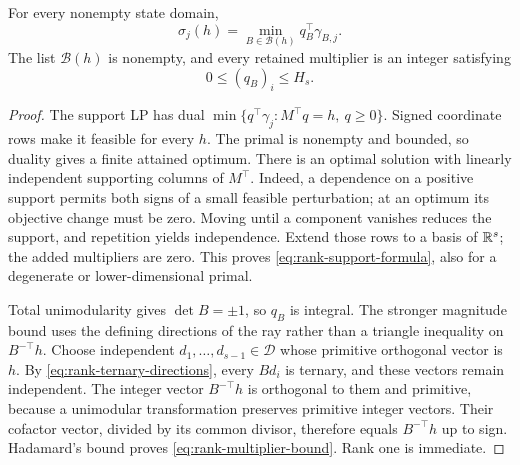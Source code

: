 \begin{lemma}\label{lem:rank-duals}
For every nonempty state domain,
\begin{equation}\label{eq:rank-support-formula}
 \sigma_j(h)=\min_{B\in\mathcal B(h)}q_B^\top\gamma_{B,j}.
\end{equation}
The list $\mathcal B(h)$ is nonempty, and every retained multiplier is
an integer satisfying
\begin{equation}\label{eq:rank-multiplier-bound}
                     0\le(q_B)_i\le H_s.
\end{equation}
\end{lemma}
\begin{proof}
The support LP has dual
$\min\{q^\top\gamma_j:M^\top q=h,\ q\ge0\}$. Signed coordinate
rows make it feasible for every $h$. The primal is nonempty and bounded,
so duality gives a finite attained optimum. There is an optimal solution
with linearly independent supporting columns of $M^\top$. Indeed, a
dependence on a positive support permits both signs of a small feasible
perturbation; at an optimum its objective change must be zero. Moving
until a component vanishes reduces the support, and repetition yields
independence. Extend those rows to a basis of $\mathbb R^s$; the added
multipliers are zero. This proves \eqref{eq:rank-support-formula}, also
for a degenerate or lower-dimensional primal.

Total unimodularity gives $\det B=\pm1$, so $q_B$ is integral. The
stronger magnitude bound uses the defining directions of the ray rather
than a triangle inequality on $B^{-\top}h$. Choose independent
$d_1,\ldots,d_{s-1}\in\mathcal D$ whose primitive orthogonal vector
is $h$. By \eqref{eq:rank-ternary-directions}, every $Bd_i$ is ternary,
and these vectors remain independent. The integer vector $B^{-\top}h$
is orthogonal to them and primitive, because a unimodular transformation
preserves primitive integer vectors. Their cofactor vector, divided by
its common divisor, therefore equals $B^{-\top}h$ up to sign. Hadamard's
bound proves \eqref{eq:rank-multiplier-bound}. Rank one is immediate.
\end{proof}

